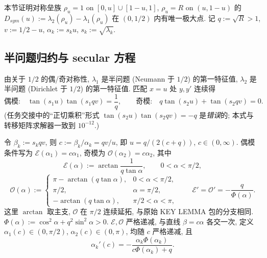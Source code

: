 \documentclass[UTF8]{ctexart}
\begin{document}
本节证明对称垒族 $\rho_u=1$ on $[0,u]\cup[1-u,1]$, $\rho_u=R$ on $(u,1-u)$ 的
$D_{sym}(u):=\lambda_2(\rho_u)-\lambda_1(\rho_u)$ 在 $(0,1/2)$ 内有唯一极大点.
记 $q:=\sqrt R>1$, $v:=1/2-u$, $\alpha_k:=s_k u$, $s_k:=\sqrt{\lambda_k}$.

\subsection{半问题归约与 secular 方程}
由关于 $1/2$ 的偶/奇对称性, $\lambda_1$ 是半问题 (Neumann 于 $1/2$) 的第一特征值,
$\lambda_2$ 是半问题 (Dirichlet 于 $1/2$) 的第一特征值. 匹配 $x=u$ 处 $y,y'$ 连续得
\begin{equation}
	\text{偶模:}\quad \tan(s_1u)\tan(s_1qv)=\frac1q,\qquad
	\text{奇模:}\quad q\tan(s_2u)+\tan(s_2qv)=0.
\end{equation}
(任务交接中的``正切乘积''形式 $\tan(s_2u)\tan(s_2qv)=-q$ 是\emph{错误}的; 本式与
转移矩阵求解器一致到 $10^{-12}$.)

令 $\beta_k:=s_k qv$, 则 $c:=\beta_k/\alpha_k=qv/u$, 即 $u=q/(2(c+q))$, $c\in(0,\infty)$.
偶模条件写为 $\mathcal E(\alpha_1)=c\alpha_1$, 奇模为 $\mathcal O(\alpha_2)=c\alpha_2$, 其中
\begin{equation}
 \mathcal E(\alpha):=\arctan\frac1{q\tan\alpha},\qquad 0<\alpha<\pi/2,
\end{equation}
\begin{equation}
 \mathcal O(\alpha):=
 \begin{cases}
 \pi-\arctan(q\tan\alpha),&0<\alpha<\pi/2,\\
 \pi/2,&\alpha=\pi/2,\\
 -\arctan(q\tan\alpha),&\pi/2<\alpha<\pi,
 \end{cases}
 \qquad \mathcal E'=\mathcal O'=-\frac q{\Phi(\alpha)}.
\end{equation}
这里 $\arctan$ 取主支, $\mathcal O$ 在 $\pi/2$ 连续延拓,
与原始 KEY LEMMA 包的分支相同.
$\Phi(\alpha):=\cos^2\alpha+q^2\sin^2\alpha>0$. $\mathcal E,\mathcal O$ 严格递减, 与直线
$\beta=c\alpha$ 各交一次, 定义 $\alpha_1(c)\in(0,\pi/2)$, $\alpha_2(c)\in(0,\pi)$, 均随
$c$ 严格递减, 且
\begin{equation}
	\alpha_k'(c)=-\frac{\alpha_k\Phi(\alpha_k)}{c\Phi(\alpha_k)+q}.
	\label{eq:alphaprime}
\end{equation}
\end{document}
